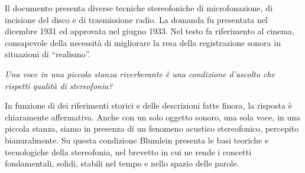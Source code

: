 Il documento presenta diverse tecniche stereofoniche di microfonazione, di
incisione del disco e di trasmissione radio. La domanda fu presentata nel
dicembre 1931 ed approvata nel giugno 1933. Nel testo fa riferimento al cinema,
consapevole della necessità di migliorare la resa della registrazione sonora
in situazioni di “realismo”.

\emph{Una voce in una piccola stanza riverberante è una condizione d'ascolto che
rispetti qualità di stereofonia?}

In funzione di dei riferimenti storici e delle descrizioni fatte finora, la
risposta è chiaramente affermativa. Anche con un solo oggetto sonoro, una sola
voce, in una piccola stanza, siamo in presenza di un fenomeno acustico
stereofonico, percepito bianuralmente. Su questa condizione Blumlein presenta
le basi teoriche e tecnologiche della stereofonia, nel brevetto in cui ne
rende i concetti fondamentali, solidi, stabili nel tempo e nello spazio delle parole.
